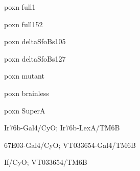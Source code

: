 \documentclass[17pt]{extarticle}
\begin{document}
\bf
\vspace*{-0.15cm}
\begin{large}
poxn full1 \\[0.5em]
\end{large}
\footnotesize
\newpage\vspace*{-0.15cm}
\begin{normalsize}
poxn full152 \\[0.5em]
\end{normalsize}
\footnotesize
\newpage\vspace*{-0.15cm}
\begin{footnotesize}
poxn deltaSfoBs105 \\[0.5em]
\end{footnotesize}
\footnotesize
\newpage\vspace*{-0.15cm}
\begin{footnotesize}
poxn deltaSfoBs127 \\[0.5em]
\end{footnotesize}
\footnotesize
\newpage\vspace*{-0.15cm}
\begin{normalsize}
poxn mutant \\[0.5em]
\end{normalsize}
\footnotesize
\newpage\vspace*{-0.15cm}
\begin{normalsize}
poxn brainless \\[0.5em]
\end{normalsize}
\footnotesize
\newpage\vspace*{-0.15cm}
\begin{normalsize}
poxn SuperA \\[0.5em]
\end{normalsize}
\footnotesize
\newpage\vspace*{-0.15cm}
\begin{scriptsize}
Ir76b-Gal4/CyO; Ir76b-LexA/TM6B \\[0.5em]
\end{scriptsize}
\footnotesize
\newpage\vspace*{-0.15cm}
\begin{scriptsize}
67E03-Gal4/CyO; VT033654-Gal4/TM6B \\[0.5em]
\end{scriptsize}
\footnotesize
\newpage\vspace*{-0.15cm}
\begin{footnotesize}
If/CyO; VT033654/TM6B \\[0.5em]
\end{footnotesize}
\end{document}

